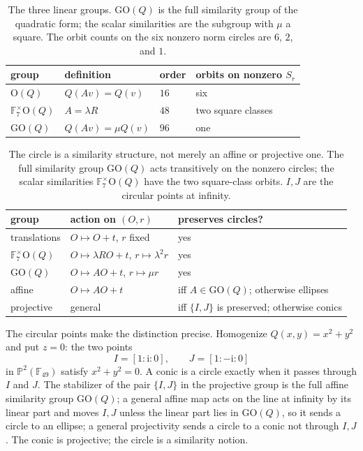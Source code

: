 \documentclass[11pt]{article}
\theoremstyle{definition}
\theoremstyle{remark}
\newcommand{\F}{\mathbb{F}}
\newcommand{\ii}{\mathrm{i}}
\newcommand{\PP}{\mathbb{P}}
\begin{document}
\begin{table}[htbp]
\centering
\small
\begin{tabular}{@{}llll@{}}
\toprule
group & definition & order & orbits on nonzero $S_r$\\
\midrule
$\mathrm O(Q)$ & $Q(Av)=Q(v)$ & $16$ & six\\
$\F_7^\times\mathrm O(Q)$ & $A=\lambda R$ & $48$ & two square classes\\
$\mathrm{GO}(Q)$ & $Q(Av)=\mu Q(v)$ & $96$ & one\\
\bottomrule
\end{tabular}
\caption{The three linear groups.  $\mathrm{GO}(Q)$ is the full similarity
group of the quadratic form; the scalar similarities are the subgroup with
$\mu$ a square.  The orbit counts on the six nonzero norm circles are
$6$, $2$, and $1$.}
\label{tab:similarity-groups}
\end{table}

\begin{table}[htbp]
\centering
\small
\begin{tabular}{@{}lll@{}}
\toprule
group & action on $(O,r)$ & preserves circles?\\
\midrule
translations & $O\mapsto O+t$, $r$ fixed & yes\\
$\F_7^\times\mathrm O(Q)$ & $O\mapsto\lambda RO+t$, $r\mapsto\lambda^2r$ & yes\\
$\mathrm{GO}(Q)$ & $O\mapsto AO+t$, $r\mapsto\mu r$ & yes\\
affine & $O\mapsto AO+t$ & iff $A\in\mathrm{GO}(Q)$; otherwise ellipses\\
projective & general & iff $\{I,J\}$ is preserved; otherwise conics\\
\bottomrule
\end{tabular}
\caption{The circle is a similarity structure, not merely an affine or
projective one.  The full similarity group $\mathrm{GO}(Q)$ acts transitively on
the nonzero circles; the scalar similarities $\F_7^\times\mathrm O(Q)$ have the
two square-class orbits.  $I,J$ are the circular points at infinity.}
\label{tab:circles}
\end{table}

The circular points make the distinction precise.  Homogenize
$Q(x,y)=x^2+y^2$ and put $z=0$: the two points
\[
  I=[1:\ii:0],\qquad J=[1:-\ii:0]
\]
in $\PP^2(\F_{49})$ satisfy $x^2+y^2=0$.  A conic is a circle exactly when it
passes through $I$ and $J$.  The stabilizer of the pair $\{I,J\}$ in the
projective group is the full affine similarity group $\mathrm{GO}(Q)$; a
general affine map acts on the line at infinity by its linear part and moves
$I,J$ unless the linear part lies in $\mathrm{GO}(Q)$, so it sends a circle to
an ellipse; a general projectivity sends a circle to a conic not through $I,J$.
The conic is projective; the circle is a similarity notion.
\end{document}
